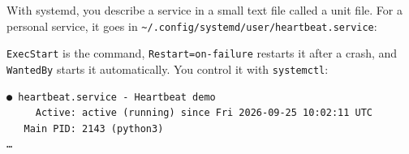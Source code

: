 
With systemd, you describe a service in a small text file called a unit file. For a personal service, it goes in \texttt{\textasciitilde{}/}\allowbreak{}\texttt{.}\allowbreak{}\texttt{config/}\allowbreak{}\texttt{systemd/}\allowbreak{}\texttt{user/}\allowbreak{}\texttt{heartbeat.}\allowbreak{}\texttt{service}:

\begin{codeblock}

\begin{Shaded}
\begin{Highlighting}[]
\KeywordTok{[Unit]}
\OtherTok{=}

\KeywordTok{[Service]}
\OtherTok{=}
\OtherTok{=}

\KeywordTok{[Install]}
\OtherTok{=}
\end{Highlighting}
\end{Shaded}

\end{codeblock}


\texttt{ExecStart} is the command, \texttt{Restart=}\allowbreak{}\texttt{on-failure} restarts it after a crash, and \texttt{WantedBy} starts it automatically. You control it with \texttt{systemctl}:

\begin{codeblock}

\begin{Shaded}
\begin{Highlighting}[]
 
 
 
\end{Highlighting}
\end{Shaded}

\end{codeblock}

\begin{codeblock}
\begin{Verbatim}[formatcom=\outputstyle]
● heartbeat.service - Heartbeat demo
     Active: active (running) since Fri 2026-09-25 10:02:11 UTC
   Main PID: 2143 (python3)
…
\end{Verbatim}
\end{codeblock}


